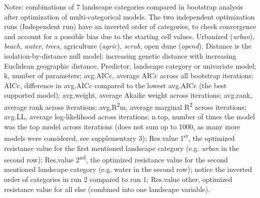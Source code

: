 \documentclass[10pt, twoside]{book} %
\begin{document}
\begin{sidewaystable}[h!]
\begin{center}
\begin{threeparttable}
\begin{footnotesize}
\begin{tablenotes}
							\item Notes: combinations of 7 landscape categories compared in bootstrap analysis after optimization of multi-categorical models. The two independent optimization runs (Independent run) have an inverted order of categories, to check convergence and account for a possible bias due to the starting cell values. Urbanized (\textit{urban}), \textit{beach}, \textit{water}, \textit{trees}, agriculture (\textit{agric}), \textit{scrub}, open dune (\textit{opend}). Distance is the isolation-by-distance null model: increasing genetic distance with increasing Euclidean geographic distance. Predictor, landscape category or univariate model; k, number of parameters; avg.AICc, average AICc across all bootstrap iterations; \textDelta AICc, difference in avg.AICc compared to the lowest avg.AICc (the best supported model); avg.weight, average Akaike weight across iterations; avg.rank, average rank across iterations; avg.R\textsuperscript{2}m, average marginal R\textsuperscript{2} across iterations; avg.LL, average log-likelihood across iterations; n.top, number of times the model was the top model across iterations (does not sum op to 1000, as many more models were considered, see supplementary 3); Res.value 1\textsuperscript{st}, the optimized resistance value for the first mentioned landscape category (e.g. \textit{urban} in the second row); Res.value 2\textsuperscript{nd}, the optimized resistance value for the second mentioned landscape category (e.g. water in the second row); notice the inverted order of categories in run 2 compared to run 1; Res.value other, optimized resistance value for all else (combined into one landscape variable).
						\end{tablenotes}
						\endgroup
						
					\end{footnotesize}
				\end{threeparttable}
			\end{center}
		\end{sidewaystable}
	\clearpage

	
\end{document}
